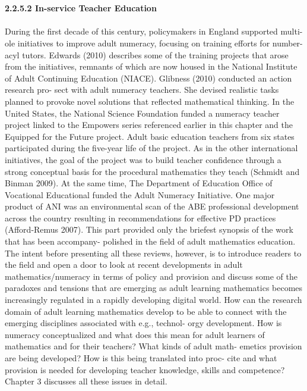 \documentclass{article}
\begin{document}
\textit{\\\\}
\textbf{ 2.2.5.2 In-service Teacher Education }
\textit{\\\\} 
 During the first decade of this century, policymakers in England supported multi-
   ole initiatives to improve adult numeracy, focusing on training efforts for number-
   acyl tutors. Edwards (2010) describes some of the training projects that arose from
 the initiatives, remnants of which are now housed in the National Institute of Adult
 Continuing Education (NIACE). Glibness (2010) conducted an action research pro-
   sect with adult numeracy teachers. She devised realistic tasks planned to provoke
 novel solutions that reflected mathematical thinking.
 In the United States, the National Science Foundation funded a numeracy
 teacher project linked to the Empowers series referenced earlier in this chapter and
 the Equipped for the Future project. Adult basic education teachers from six states
 participated during the five-year life of the project. As in the other international
 initiatives, the goal of the project was to build teacher confidence through a strong
 conceptual basis for the procedural mathematics they teach (Schmidt and Binman
 2009). At the same time, The Department of Education Office of Vocational
 Educational funded the Adult Numeracy Initiative. One major product of ANI was
 an environmental scan of the ABE professional development across the country
 resulting in recommendations for effective PD practices (Afford-Remus 2007).
 This part provided only the briefest synopsis of the work that has been accompany-
   polished in the field of adult mathematics education. The intent before presenting
 all these reviews, however, is to introduce readers to the field and open a door to
 look at recent developments in adult mathematics/numeracy in terms of policy and
 provision and discuss some of the paradoxes and tensions that are emerging as
 adult learning mathematics becomes increasingly regulated in a rapidly developing
 digital world. How can the research domain of adult learning mathematics develop
 to be able to connect with the emerging disciplines associated with e.g., technol-
   orgy development. How is numeracy conceptualized and what does this mean for
 adult learners of mathematics and for their teachers? What kinds of adult math-
   emetics provision are being developed? How is this being translated into proc-
   cite and what provision is needed for developing teacher knowledge, skills and
 ­competence? Chapter 3 discusses all these issues in detail.
\end{document}
